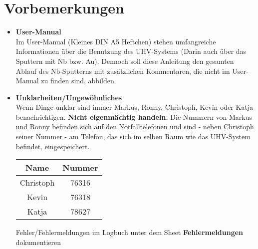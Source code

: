 \documentclass[
  ngerman,
  twoside,
  captions=tableheading,
  BCOR=.5cm,
  fontsize=11,
  ]{scrreprt}
\begin{document}
\section{Vorbemerkungen}
\begin{itemize}
\item \textbf{User-Manual}\\
Im User-Manual (Kleines DIN A5 Heftchen) stehen umfangreiche Informationen über die Benutzung des UHV-Systems (Darin auch über das Sputtern mit Nb bzw. Au). Dennoch soll diese Anleitung den gesamten Ablauf des Nb-Sputterns mit zusätzlichen Kommentaren, die nicht im User-Manual zu finden sind, abbilden.
\item \textbf{Unklarheiten/Ungewöhnliches}\\
Wenn Dinge unklar sind immer Markus, Ronny, Christoph, Kevin oder Katja benachrichtigen. \textbf{Nicht eigenmächtig handeln.} Die Nummern von Markus und Ronny befinden sich auf den Notfalltelefonen und sind - neben Christoph seiner Nummer - am Telefon, das sich im selben Raum wie das UHV-System befindet, eingespeichert.
\begin{center}
\begin{tabular}{| c | c |}\hline
\textbf{Name} & \textbf{Nummer}\\ \hline
Christoph & 76316\\
Kevin & 76318\\
Katja & 78627\\ \hline
\end{tabular}
\end{center}

\begin{center}
Fehler/Fehlermeldungen im Logbuch unter dem Sheet \textbf{Fehlermeldungen} dokumentieren
\end{center}

\end{itemize}
\end{document}
